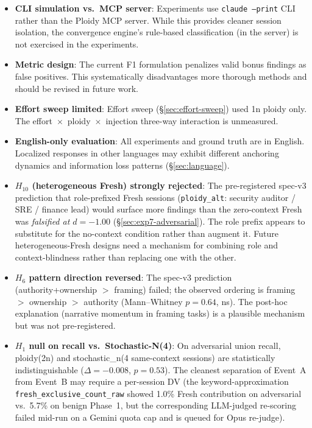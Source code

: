 \documentclass[11pt]{article}
\begin{document}
\begin{itemize}[leftmargin=1.5em]
  \item \textbf{CLI simulation vs.\ MCP server}: Experiments use \texttt{claude --print} CLI rather than the Ploidy MCP server. While this provides cleaner session isolation, the convergence engine's rule-based classification (in the server) is not exercised in the experiments.
  \item \textbf{Metric design}: The current F1 formulation penalizes valid bonus findings as false positives. This systematically disadvantages more thorough methods and should be revised in future work.
  \item \textbf{Effort sweep limited}: Effort sweep (\S\ref{sec:effort-sweep}) used 1n ploidy only. The effort~$\times$~ploidy~$\times$~injection three-way interaction is unmeasured.
  \item \textbf{English-only evaluation}: All experiments and ground truth are in English. Localized responses in other languages may exhibit different anchoring dynamics and information loss patterns (\S\ref{sec:language}).
  \item \textbf{$H_{10}$ (heterogeneous Fresh) strongly rejected}: The pre-registered spec-v3 prediction that role-prefixed Fresh sessions (\texttt{ploidy\_alt}: security auditor / SRE / finance lead) would surface more findings than the zero-context Fresh was \emph{falsified at $d = -1.00$} (\S\ref{sec:exp7-adversarial}). The role prefix appears to substitute for the no-context condition rather than augment it. Future heterogeneous-Fresh designs need a mechanism for combining role and context-blindness rather than replacing one with the other.
  \item \textbf{$H_6$ pattern direction reversed}: The spec-v3 prediction (authority+ownership $>$ framing) failed; the observed ordering is framing $>$ ownership $>$ authority (Mann--Whitney $p = 0.64$, ns). The post-hoc explanation (narrative momentum in framing tasks) is a plausible mechanism but was not pre-registered.
  \item \textbf{$H_1$ null on recall vs.\ Stochastic-N(4)}: On adversarial union recall, ploidy(2n) and stochastic\_n(4 same-context sessions) are statistically indistinguishable ($\Delta = -0.008$, $p = 0.53$). The cleanest separation of Event~A from Event~B may require a per-session DV (the keyword-approximation \texttt{fresh\_exclusive\_count\_raw} showed 1.0\% Fresh contribution on adversarial vs.\ 5.7\% on benign Phase~1, but the corresponding LLM-judged re-scoring failed mid-run on a Gemini quota cap and is queued for Opus re-judge).

\end{itemize}
\end{document}
